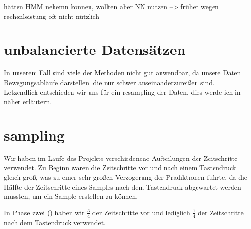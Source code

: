 hätten HMM nehemn konnen, wollten aber NN nutzen --> früher wegen rechenleistung oft nicht nützlich

\section{unbalancierte Datensätzen}



In unserem Fall sind viele der Methoden nicht gut anwendbar, da unsere Daten Bewegungsabläufe darstellen, die nur schwer auseinanderzureißen sind. Letzendlich entschieden wir uns für ein resampling der Daten, dies werde ich in  näher erläutern.

\section{sampling}
Wir haben im Laufe des Projekts verschiedenene Aufteilungen der Zeitschritte verwendet. Zu Beginn waren die Zeitschritte vor und nach einem Tastendruck gleich groß, was zu einer sehr großen Verzögerung der Prädiktionen führte, da die Hälfte der Zeitschritte eines Samples nach dem Tastendruck abgewartet werden mussten, um ein Sample erstellen zu können.

In Phase zwei () haben wir $\frac{3}{4}$ der Zeitschritte vor und lediglich $\frac{1}{4}$ der Zeitschritte nach dem Tastendruck verwendet.
